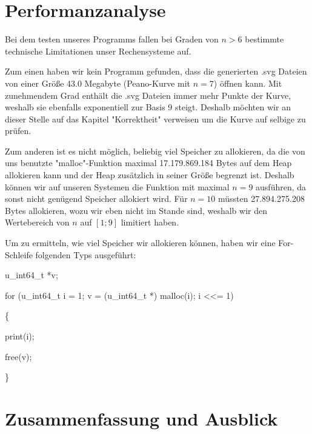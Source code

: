 \documentclass[course=asp]{aspdoc}
\begin{document}
\newpage
\section{Performanzanalyse}

Bei dem testen unseres Programms fallen bei Graden von $n > 6$ bestimmte technische Limitationen unser Rechensysteme auf. 

Zum einen haben wir kein Programm gefunden, dass die generierten .svg Dateien von einer Größe 43.0 Megabyte (Peano-Kurve mit $n = 7$) öffnen kann. Mit zunehmendem Grad enthält die .svg Dateien immer mehr Punkte der Kurve, weshalb sie ebenfalls exponentiell zur Basis 9 steigt. Deshalb möchten wir an dieser Stelle auf das Kapitel "Korrektheit" verweisen um die Kurve auf selbige zu prüfen.

Zum anderen ist es nicht möglich, beliebig viel Speicher zu allokieren, da die von uns benutzte  "malloc"-Funktion maximal 17.179.869.184 Bytes auf dem Heap allokieren kann und der Heap zusätzlich in seiner Größe begrenzt ist. Deshalb können wir auf unseren Systemen die Funktion mit maximal $n = 9$ ausführen, da sonst nicht genügend Speicher allokiert wird. Für $n = 10$ müssten 27.894.275.208 Bytes allokieren, wozu wir eben nicht im Stande sind, weshalb wir den Wertebereich von $n$ auf $[1;9]$ limitiert haben.

Um zu ermitteln, wie viel Speicher wir allokieren können, haben wir eine For-Schleife  folgenden Typs ausgeführt:

\begin{PseudoCode} %
u\_int64\_t *v;    	


for (u\_int64\_t i = 1; v = (u\_int64\_t *) malloc(i); i <<= 1)   

  
\{     

    
print(i);  
	
	      
free(v);    
	
	 
\}
\end{PseudoCode}



\newpage
\section{Zusammenfassung und Ausblick}


{}
\end{document}

